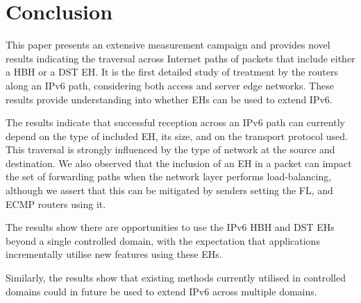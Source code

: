 \documentclass[conference]{IEEEtran}
\begin{document}
 
\section{Conclusion}
\label{sec:conclusion}

This paper presents an extensive measurement campaign and provides novel results indicating the traversal across Internet paths of packets that include either a HBH or a DST EH. It is the first detailed study of treatment by the routers along an IPv6 path, considering both access and server edge networks. These results provide understanding into whether EHs can be used to extend IPv6.

The results indicate that successful reception across an IPv6 path can currently depend on the type of included EH, its size, and on the transport protocol used. This traversal is
strongly influenced by the type of network at the source and destination.
We also observed that the inclusion of an EH in a packet can impact the set of forwarding paths when the network layer performs load-balancing, although we assert that this can be mitigated by senders setting the FL, and ECMP routers using it.

The results show there are opportunities to use the IPv6 HBH and DST EHs beyond a single controlled domain, with the expectation that applications incrementally utilise new features using these EHs. 

Similarly, the results show that existing methods currently utilised in controlled domains could in future be used to extend IPv6 across multiple domains.
\end{document}
